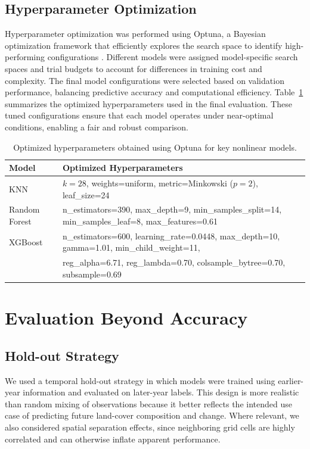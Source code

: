 \documentclass[11pt]{article}
\begin{document}
\subsection{Hyperparameter Optimization}

Hyperparameter optimization was performed using Optuna, a Bayesian optimization framework that efficiently explores the search space to identify high-performing configurations \citep{akiba2019optunanextgenerationhyperparameteroptimization}. Different models were assigned model-specific search spaces and trial budgets to account for differences in training cost and complexity.
The final model configurations were selected based on validation performance, balancing predictive accuracy and computational efficiency. Table~\ref{tab:hyperparameters} summarizes the optimized hyperparameters used in the final evaluation. These tuned configurations ensure that each model operates under near-optimal conditions, enabling a fair and robust comparison.

\begin{table}[t]
\centering
\small
\setlength{\tabcolsep}{5pt}
\renewcommand{\arraystretch}{1.1}
\begin{tabular}{ll}
\hline
\textbf{Model} & \textbf{Optimized Hyperparameters} \\
\hline

KNN & $k=28$, weights=uniform, metric=Minkowski ($p=2$), leaf\_size=24 \\

Random Forest & n\_estimators=390, max\_depth=9, min\_samples\_split=14, min\_samples\_leaf=8, max\_features=0.61 \\

XGBoost & n\_estimators=600, learning\_rate=0.0448, max\_depth=10, gamma=1.01, min\_child\_weight=11, \\
         & reg\_alpha=6.71, reg\_lambda=0.70, colsample\_bytree=0.70, subsample=0.69 \\

\hline
\end{tabular}
\caption{Optimized hyperparameters obtained using Optuna for key nonlinear models.}
\label{tab:hyperparameters}
\end{table}

\section{Evaluation Beyond Accuracy}
\subsection{Hold-out Strategy} We used a temporal hold-out strategy in which models were trained using earlier-year information and evaluated on later-year labels. This design is more realistic than random mixing of observations because it better reflects the intended use case of predicting future land-cover composition and change. Where relevant, we also considered spatial separation effects, since neighboring grid cells are highly correlated and can otherwise inflate apparent performance.
\end{document}
